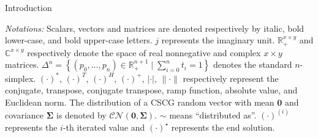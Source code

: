 \documentclass[journal]{IEEEtran}
\begin{document}
\begin{section}{Introduction}

	\emph{Notations:} Scalars, vectors and matrices are denoted respectively by italic, bold lower-case, and bold upper-case letters.
	$j$ represents the imaginary unit.
	$\mathbb{R}_+^{x \times y}$ and $\mathbb{C}^{x \times y}$ respectively denote the space of real nonnegative and complex $x \times y$ matrices.
	$\Delta^n = \left\{ (p_0,\dots,p_n) \in \mathbb{R}_+^{n+1} \mid \sum_{i=0}^n t_i = 1 \right\}$ denotes the standard $n$-simplex.
	$(\cdot)^*$, $(\cdot)^T$, $(\cdot)^H$, $(\cdot)^+$, $\lvert{\cdot}\rvert$, $\lVert{\cdot}\rVert$ respectively represent the conjugate, transpose, conjugate transpose, ramp function, absolute value, and Euclidean norm.
	The distribution of a CSCG random vector with mean $\boldsymbol{0}$ and covariance $\boldsymbol{\Sigma}$ is denoted by $\mathcal{CN}(\boldsymbol{0},\boldsymbol{\Sigma})$.
	$\sim$ means ``distributed as''.
	$(\cdot)^{(i)}$ represents the $i$-th iterated value and $(\cdot)^{\star}$ represents the end solution.
\end{section}
\end{document}
